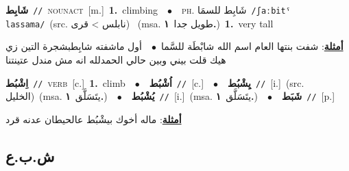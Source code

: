 \documentclass[10pt,a4paper,twoside]{article} %
\begin{document}
\begin{multicols}{2}
{{{{{{{{{{{\setlength\topsep{0pt}\textbf{\foreignlanguage{arabic}{شَابِط}}\ {\color{gray}\texttt{//}\color{black}}\ \textsc{noun\textunderscore act}\ [m.]\ \textbf{1.}~climbing\ \ $\bullet$\ \ \textsc{ph.} \color{gray} \foreignlanguage{arabic}{شَابِط للسمَا}\color{black}\ {\color{gray}\texttt{/{\sffamily ʃaːbitˤ lassama}/}\color{black}}\ \color{gray}(src. \foreignlanguage{arabic}{نابلس > قرى})\color{black}\ \color{gray} (msa. \foreignlanguage{arabic}{طويل جدا}~\foreignlanguage{arabic}{\textbf{١.}})\color{black}\ \textbf{1.}~very tall\  \begin{flushright}\color{gray}\foreignlanguage{arabic}{\textbf{\underline{\foreignlanguage{arabic}{أمثلة}}}: شفت بنتها العام اسم الله شابْطَة للسَّما\ $\bullet$\ \  أول ماشفته شابِطبشجرة التين زي هيك قلت بيني وبين حالي الحمدلله انه مش مندل عتينتنا}\end{flushright}\color{black}} \vspace{2mm}

{\setlength\topsep{0pt}\textbf{\foreignlanguage{arabic}{اِشْبُط}}\ {\color{gray}\texttt{//}\color{black}}\ \textsc{verb}\ [c.]\ \textbf{1.}~climb\ \ $\bullet$\ \ \setlength\topsep{0pt}\textbf{\foreignlanguage{arabic}{اُشْبُط}}\ {\color{gray}\texttt{//}\color{black}}\ [c.]\ \ $\bullet$\ \ \setlength\topsep{0pt}\textbf{\foreignlanguage{arabic}{يِشْبُط}}\ {\color{gray}\texttt{//}\color{black}}\ [i.]\ (src. \color{gray}\foreignlanguage{arabic}{الخليل}\color{black})\ \color{gray}(msa. \foreignlanguage{arabic}{يتَسَلَّق}~\foreignlanguage{arabic}{\textbf{١.}})\color{black}\ \ $\bullet$\ \ \setlength\topsep{0pt}\textbf{\foreignlanguage{arabic}{يُشْبُط}}\ {\color{gray}\texttt{//}\color{black}}\ [i.]\ \color{gray}(msa. \foreignlanguage{arabic}{يتَسَلَّق}~\foreignlanguage{arabic}{\textbf{١.}})\color{black}\ \ $\bullet$\ \ \setlength\topsep{0pt}\textbf{\foreignlanguage{arabic}{شَبَط}}\ {\color{gray}\texttt{//}\color{black}}\ [p.]\  \begin{flushright}\color{gray}\foreignlanguage{arabic}{\textbf{\underline{\foreignlanguage{arabic}{أمثلة}}}: ماله أخوك بيشْبُط عالحيطان عدنه قرد}\end{flushright}\color{black}} \vspace{2mm}

\vspace{-3mm}
\subsection*{\color{blue}\foreignlanguage{arabic}{ش.ب.ع}\color{blue}{}} 

}}}}}}}}}}
\end{multicols}
\end{document}
